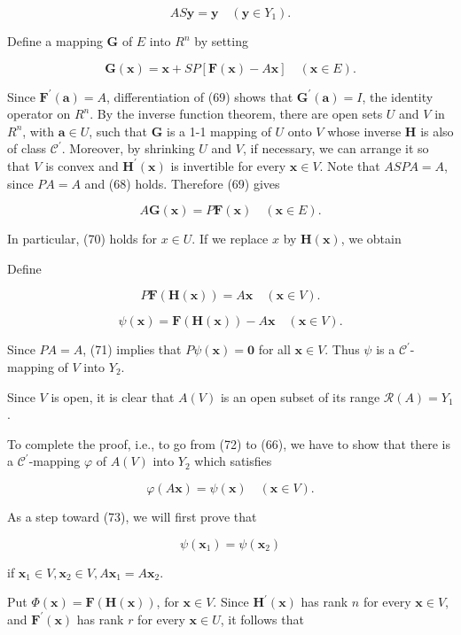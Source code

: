 \documentclass[10pt]{article}
\begin{document}
$$
A S \mathbf{y}=\mathbf{y} \quad\left(\mathbf{y} \in Y_{1}\right) .
$$

Define a mapping $\mathbf{G}$ of $E$ into $R^{n}$ by setting

$$
\mathbf{G}(\mathbf{x})=\mathbf{x}+S P[\mathbf{F}(\mathbf{x})-A \mathbf{x}] \quad(\mathbf{x} \in E) .
$$

Since $\mathbf{F}^{\prime}(\mathbf{a})=A$, differentiation of (69) shows that $\mathbf{G}^{\prime}(\mathbf{a})=I$, the identity operator on $R^{n}$. By the inverse function theorem, there are open sets $U$ and $V$ in $R^{n}$, with $\mathbf{a} \in U$, such that $\mathbf{G}$ is a 1-1 mapping of $U$ onto $V$ whose inverse $\mathbf{H}$ is also of class $\mathscr{C}^{\prime}$. Moreover, by shrinking $U$ and $V$, if necessary, we can arrange it so that $V$ is convex and $\mathbf{H}^{\prime}(\mathbf{x})$ is invertible for every $\mathbf{x} \in V$. Note that $A S P A=A$, since $P A=A$ and (68) holds. Therefore (69) gives

$$
A \mathbf{G}(\mathbf{x})=P \mathbf{F}(\mathbf{x}) \quad(\mathbf{x} \in E) .
$$

In particular, (70) holds for $x \in U$. If we replace $x$ by $\mathbf{H}(\mathbf{x})$, we obtain

Define

$$
P \mathbf{F}(\mathbf{H}(\mathbf{x}))=A \mathbf{x} \quad(\mathbf{x} \in V) .
$$

$$
\psi(\mathbf{x})=\mathbf{F}(\mathbf{H}(\mathbf{x}))-A \mathbf{x} \quad(\mathbf{x} \in V) .
$$

Since $P A=A$, (71) implies that $P \psi(\mathbf{x})=\mathbf{0}$ for all $\mathbf{x} \in V$. Thus $\psi$ is a $\mathscr{C}^{\prime}$-mapping of $V$ into $Y_{2}$.

Since $V$ is open, it is clear that $A(V)$ is an open subset of its range $\mathscr{R}(A)=Y_{1}$.

To complete the proof, i.e., to go from (72) to (66), we have to show that there is a $\mathscr{C}^{\prime}$-mapping $\varphi$ of $A(V)$ into $Y_{2}$ which satisfies

$$
\varphi(A \mathbf{x})=\psi(\mathbf{x}) \quad(\mathbf{x} \in V) .
$$

As a step toward (73), we will first prove that

$$
\psi\left(\mathbf{x}_{1}\right)=\psi\left(\mathbf{x}_{2}\right)
$$

if $\mathbf{x}_{1} \in V, \mathbf{x}_{2} \in V, A \mathbf{x}_{1}=A \mathbf{x}_{2}$.

Put $\Phi(\mathbf{x})=\mathbf{F}(\mathbf{H}(\mathbf{x}))$, for $\mathbf{x} \in V$. Since $\mathbf{H}^{\prime}(\mathbf{x})$ has rank $n$ for every $\mathbf{x} \in V$, and $\mathbf{F}^{\prime}(\mathbf{x})$ has rank $r$ for every $\mathbf{x} \in U$, it follows that
\end{document}

